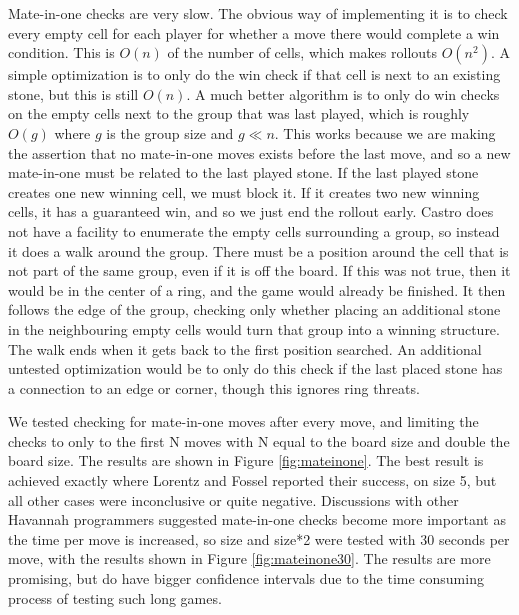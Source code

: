 Mate-in-one checks are very slow. The obvious way of implementing it is to check every empty cell for each player for whether a move there would complete a win condition. This is $O(n)$ of the number of cells, which makes rollouts $O(n^2)$. A simple optimization is to only do the win check if that cell is next to an existing stone, but this is still $O(n)$. A much better algorithm is to only do win checks on the empty cells next to the group that was last played, which is roughly $O(g)$ where $g$ is the group size and $g \ll n$. This works because we are making the assertion that no mate-in-one moves exists before the last move, and so a new mate-in-one must be related to the last played stone. If the last played stone creates one new winning cell, we must block it. If it creates two new winning cells, it has a guaranteed win, and so we just end the rollout early. Castro does not have a facility to enumerate the empty cells surrounding a group, so instead it does a walk around the group. There must be a position around the cell that is not part of the same group, even if it is off the board. If this was not true, then it would be in the center of a ring, and the game would already be finished. It then follows the edge of the group, checking only whether placing an additional stone in the neighbouring empty cells would turn that group into a winning structure. The walk ends when it gets back to the first position searched. An additional untested optimization would be to only do this check if the last placed stone has a connection to an edge or corner, though this ignores ring threats.

We tested checking for mate-in-one moves after every move, and limiting the checks to only to the first N moves with N equal to the board size and double the board size. The results are shown in Figure \ref{fig:mateinone}. The best result is achieved exactly where Lorentz and Fossel reported their success, on size 5, but all other cases were inconclusive or quite negative. Discussions with other Havannah programmers suggested mate-in-one checks become more important as the time per move is increased, so size and size*2 were tested with 30 seconds per move, with the results shown in Figure \ref{fig:mateinone30}. The results are more promising, but do have bigger confidence intervals due to the time consuming process of testing such long games.

